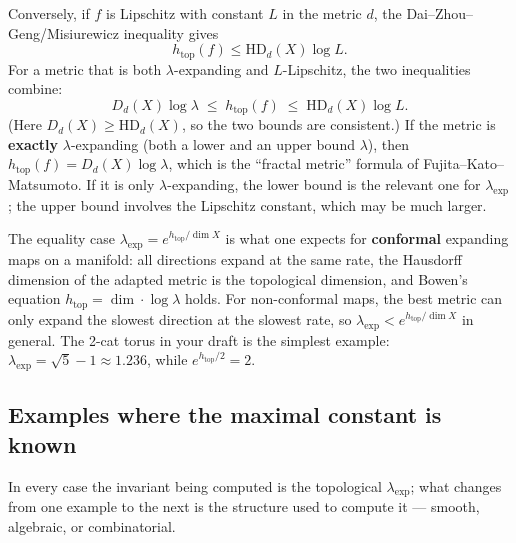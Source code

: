 \documentclass[
]{article}
\begin{document}
Conversely, if \(f\) is Lipschitz with constant \(L\) in the metric
\(d\), the Dai--Zhou--Geng/Misiurewicz inequality gives \[
h_{\mathrm{top}}(f)\le \mathrm{HD}_d(X)\log L.
\] For a metric that is both \(\lambda\)-expanding and \(L\)-Lipschitz,
the two inequalities combine: \[
D_d(X)\log\lambda\;\le\;h_{\mathrm{top}}(f)\;\le\;\mathrm{HD}_d(X)\log L.
\] (Here \(D_d(X)\ge\mathrm{HD}_d(X)\), so the two bounds are
consistent.) If the metric is \textbf{exactly} \(\lambda\)-expanding
(both a lower and an upper bound \(\lambda\)), then
\(h_{\mathrm{top}}(f)=D_d(X)\log\lambda\), which is the ``fractal
metric'' formula of Fujita--Kato--Matsumoto. If it is only
\(\lambda\)-expanding, the lower bound is the relevant one for
\(\lambda_{\exp}\); the upper bound involves the Lipschitz constant,
which may be much larger.

The equality case \(\lambda_{\exp}=e^{h_{\mathrm{top}}/\dim X}\) is what
one expects for \textbf{conformal} expanding maps on a manifold: all
directions expand at the same rate, the Hausdorff dimension of the
adapted metric is the topological dimension, and Bowen's equation
\(h_{\mathrm{top}}=\dim\cdot\log\lambda\) holds. For non-conformal maps,
the best metric can only expand the slowest direction at the slowest
rate, so \(\lambda_{\exp}<e^{h_{\mathrm{top}}/\dim X}\) in general. The
2-cat torus in your draft is the simplest example:
\(\lambda_{\exp}=\sqrt5-1\approx1.236\), while
\(e^{h_{\mathrm{top}}/2}=2\).

\subsection{Examples where the maximal constant is
known}\label{examples-where-the-maximal-constant-is-known}

In every case the invariant being computed is the topological
\(\lambda_{\exp}\); what changes from one example to the next is the
structure used to compute it --- smooth, algebraic, or combinatorial.
\end{document}

